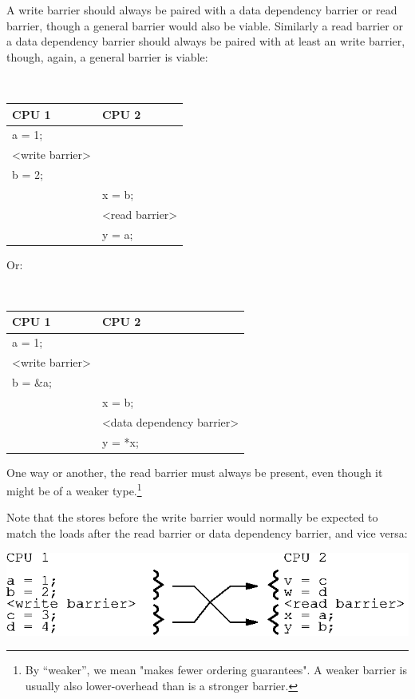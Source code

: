 A write barrier should always be paired with a data dependency barrier or read
barrier, though a general barrier would also be viable.  Similarly a read
barrier or a data dependency barrier should always be paired with at least an
write barrier, though, again, a general barrier is viable:

\vspace{5pt}
\begin{minipage}[t]{\columnwidth}
\tt
\begin{tabular}{l|p{1.5in}}
	CPU 1 &		CPU 2 \\
	\hline
	a = 1; & \\
	<write barrier> & \\
	b = 2;	&	\\
		&	x = b; \\
		&	<read barrier> \\
		&	y = a; \\
\end{tabular}
\end{minipage}
\vspace{5pt}

Or:

\vspace{5pt}
\begin{minipage}[t]{\columnwidth}
\tt
\begin{tabular}{l|p{1.5in}}
	CPU 1 &		CPU 2 \\
	\hline
	a = 1; & \\
	<write barrier> & \\
	b = \&a; &	\\
		&	x = b; \\
		&	<data dependency barrier> \\
		&	y = *x; \\
\end{tabular}
\end{minipage}
\vspace{5pt}

One way or another, the read barrier must always be present, even though
it might be of a weaker type.\footnote{
	By ``weaker'', we mean "makes fewer ordering guarantees".
	A weaker barrier is usually also lower-overhead than is a
	stronger barrier.}

Note that the stores before the write barrier would normally be expected to
match the loads after the read barrier or data dependency barrier, and vice
versa:

\begin{center}
\includegraphics{advsync/MemoryBarrierPairing}
\end{center}

